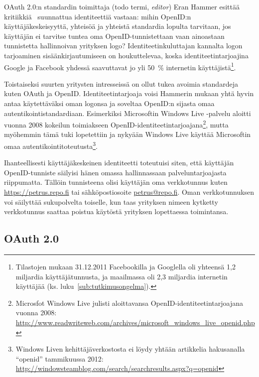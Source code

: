 \documentclass[finnish,gradu]{tktltiki}
\begin{document}
    OAuth 2.0:n standardin toimittaja (todo termi, \emph{editor}) Eran Hammer esittää kritiikkiä~\cite{hueniverse_openid_crisis} suunnattua identiteettiä vastaan: mihin OpenID:n käyttäjäkeskeisyyttä, yhteisöä ja yhteistä standardia lopulta tarvitaan, jos käyttäjän ei tarvitse tuntea oma OpenID-tunnistettaan vaan ainoastaan tunnistetta hallinnoivan yrityksen logo? Identiteetinkuluttajan kannalta logon tarjoaminen sisäänkirjautumiseen on houkuttelevaa, koska identiteetintarjoajina Google ja Facebook yhdessä saavuttavat jo yli 50~\% internetin käyttäjistä\footnote{Tilastojen mukaan 31.12.2011 Facebookilla ja Googlella oli yhteensä 1,2 miljardia käyttäjätunnusta, ja maailmassa oli 2,3 miljardia internetin käyttäjää (ks. luku~\ref{sub:tutkimusongelma}).}.

    Toistaiseksi suurten yritysten intresseissä on ollut tukea avoimia standardeja kuten OAuth ja OpenID. Identiteetintarjoaja voisi Hammerin mukaan yhtä hyvin antaa käytettäväksi oman logonsa ja soveltaa OpenID:n sijasta omaa autentikointistandardiaan. Esimerkiksi Microsoftin Windows Live -palvelu aloitti vuonna 2008  kokeilun toimiakseen OpenID-identiteetintarjoajana\footnote{Microsfot Windows Live julisti aloittavansa OpenID-identiteetintarjoajana vuonna 2008: \\ \url{http://www.readwriteweb.com/archives/microsoft_windows_live_openid.php}},
  mutta myöhemmin tämä tuki lopetettiin ja nykyään Windows Live käyttää Microsoftin omaa autentikointitoteutusta\footnote{Windows Liven kehittäjäverkostosta ei löydy yhtään artikkelia hakusanalla ``openid'' tammikuussa 2012: \url{http://windowsteamblog.com/search/searchresults.aspx?q=openid}}.

  Ihanteellisesti käyttäjäkeskeinen identiteetti toteutuisi siten, että käyttäjän OpenID-tunniste säilyisi hänen omassa hallinnassaan palveluntarjoajasta riippumatta. Tällöin tunnisteena olisi käyttäjän oma verkkotunnus kuten \url{https://petrus.repo.fi} tai sähköpostiosoite \url{petrus@repo.fi}. Oman verkkotunnuksen voi säilyttää sukupolvelta toiselle, kun taas yrityksen nimeen kytketty verkkotunnus saattaa poistua käytöstä yrityksen lopettaessa toimintansa.





  \subsection{OAuth 2.0} %
  \label{sub:oauth}
\end{document}
